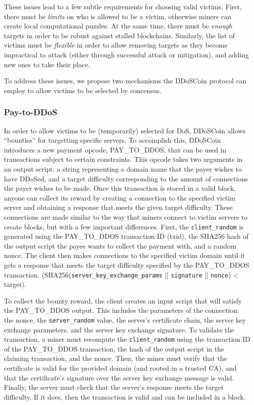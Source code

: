 These issues lead to a few subtle requirements for choosing valid victims.
First, there must be \emph{limits} on who is allowed to be a victim, otherwise
miners can create local computational puzzles. At the same time, there must be
\emph{enough} targets in order to be robust against stalled blockchains.
Similarly, the list of victims must be \emph{flexible} in order to allow
removing targets as they become impractical to attack (either
through successful attack or mitigation), and adding new ones to take their
place.

To address these issues, we propose two mechanisms the DDoSCoin protocol can
employ to allow victims to be selected by concensus.


\subsubsection{Pay-to-DDoS}

In order to allow victims to be (temporarily) selected for DoS, DDoSCoin allows
``bounties'' for targetting specific servers. To accomplish this, DDoSCoin
introduces a new payment opcode, PAY\_TO\_DDOS, that can be used in transactions
subject to certain constraints. This opcode takes two arguments in an output
script: a string representing a domain name that the payer wishes to have
DDoSed, and a target difficulty corresponding to the amount of connections the
payer wishes to be made. Once this transaction is stored in a valid block,
anyone can collect its reward by creating a connection to the specified victim
server and obtaining a response that meets the given target difficulty. These
connections are made similar to the way that miners connect to victim servers to
create blocks, but with a few important differences. First, the
\texttt{client\_random} is generated using the PAY\_TO\_DDOS transaction ID
(txid), the SHA256 hash of the output script the payee wants to collect the
payment with, and a random nonce.  The client then makes connections to the
specified victim domain until it gets a response that meets the target
difficulty specified by the PAY\_TO\_DDOS transaction.
(SHA256(\texttt{server\_key\_exchange\_params} || \texttt{signature} ||
\texttt{nonce}) < target).

To collect the bounty reward, the client creates an input script that will
satisfy the PAY\_TO\_DDOS output. This includes the parameters of the
connection: the nonce, the \texttt{server\_random} value, the server's
certificate chain, the server key exchange parameters, and the server key
exchange signature. To validate the transaction, a miner must recompute the
\texttt{client\_random} using the transaction ID of the PAY\_TO\_DDOS
transaction, the hash of the output script in the claiming transaction, and the
nonce. Then, the miner must verify that the certificate is valid for the
provided domain (and rooted in a trusted CA), and that the certificate's
signature over the server key exchange message is valid. Finally, the server
must check that the server's response meets the target difficulty. If it does,
then the transaction is valid and can be included in a block.

